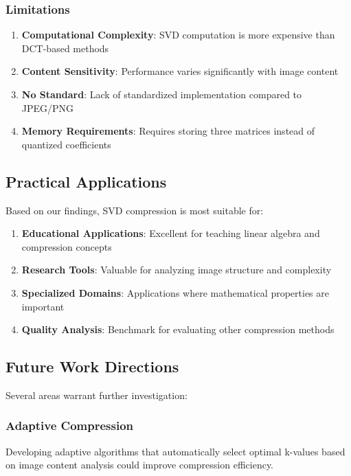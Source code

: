\documentclass[12pt,a4paper]{article}
\begin{document}
\subsubsection{Limitations}

\begin{enumerate}
    \item \textbf{Computational Complexity}: SVD computation is more expensive than DCT-based methods
    \item \textbf{Content Sensitivity}: Performance varies significantly with image content
    \item \textbf{No Standard}: Lack of standardized implementation compared to JPEG/PNG
    \item \textbf{Memory Requirements}: Requires storing three matrices instead of quantized coefficients
\end{enumerate}

\subsection{Practical Applications}

Based on our findings, SVD compression is most suitable for:

\begin{enumerate}
    \item \textbf{Educational Applications}: Excellent for teaching linear algebra and compression concepts
    \item \textbf{Research Tools}: Valuable for analyzing image structure and complexity
    \item \textbf{Specialized Domains}: Applications where mathematical properties are important
    \item \textbf{Quality Analysis}: Benchmark for evaluating other compression methods
\end{enumerate}

\subsection{Future Work Directions}

Several areas warrant further investigation:

\subsubsection{Adaptive Compression}

Developing adaptive algorithms that automatically select optimal k-values based on image content analysis could improve compression efficiency.
\end{document}
